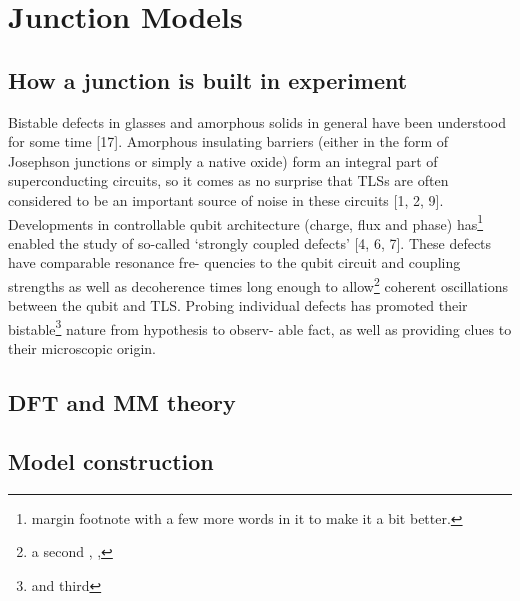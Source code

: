 \chapter{Junction Models}

\section{How a junction is built in experiment}
Bistable defects  in glasses and amorphous solids in general have been understood for some time [17].
Amorphous insulating barriers (either in the form of Josephson junctions or simply a native oxide) form an integral part of superconducting circuits, so it comes as no surprise that TLSs are often considered to be an important source of noise in these circuits [1, 2, 9]. Developments in controllable
qubit architecture (charge, flux and phase) has\footnote{margin footnote with a few more words in it to make it a bit better.} enabled the study of so-called
‘strongly coupled defects’ [4, 6, 7]. These defects have comparable resonance fre-
quencies to the qubit circuit and coupling strengths as well as decoherence times
long enough to allow\footnote{a second \the\marginparwidth, \the\marginparsep, \the\marginparpush} coherent oscillations between the qubit and TLS. Probing
individual defects has promoted their bistable\footnote{and third} nature from hypothesis to observ-
able fact, as well as providing clues to their microscopic origin.

\section{DFT and MM theory}
\section{Model construction}
